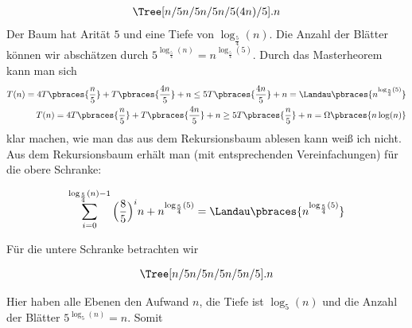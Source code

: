 \begin{solution}
	\begin{align*}
	\Tree [n/5 n/5 n/5 n/5 (4n)/5 ].n
	\end{align*}
	Der Baum hat Arität $5$ und eine Tiefe von $\log_{\frac{5}{4}}(n)$. Die Anzahl der Blätter können wir abschätzen durch $5^{\log_\frac{5}{4}(n)} = n^{\log_{\frac{5}{4}}(5)}$. Durch das Masterheorem kann man sich
	\begin{align*}
	T(n) = 4 T\pbraces{\frac{n}{5}} + T\pbraces{\frac{4n}{5}} + n \leq 5 T\pbraces{\frac{4n}{5}} + n = \Landau\pbraces{n^{\log_\frac{5}{4}(5)}} \\
	T(n) = 4 T\pbraces{\frac{n}{5}} + T\pbraces{\frac{4n}{5}} + n \geq 5 T\pbraces{\frac{n}{5}} + n = \Omega\pbraces{n\log(n)}
	\end{align*}
	klar machen, wie man das aus dem Rekursionsbaum ablesen kann weiß ich nicht. Aus dem Rekursionsbaum erhält man (mit entsprechenden Vereinfachungen) für die obere Schranke:

  \begin{align*}
    \sum_{i=0}^{\log_{\frac{5}{4}}(n)-1} \Big(\frac{8}{5}\Big)^i n + n^{\log_{\frac{5}{4}}(5)} = \Landau\pbraces{n^{\log_\frac{5}{4}(5)}}
  \end{align*}

  Für die untere Schranke betrachten wir

  \begin{align*}
	\Tree [n/5 n/5 n/5 n/5 n/5 ].n
	\end{align*}

  Hier haben alle Ebenen den Aufwand $n$, die Tiefe ist $\log_5(n)$ und die Anzahl der Blätter $5^{\log_5(n)} = n$. Somit


\end{solution}
